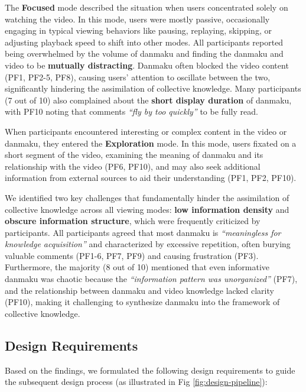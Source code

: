 The \textbf{Focused} mode described the situation when users concentrated solely on watching the video. In this mode, users were mostly passive, occasionally engaging in typical viewing behaviors like pausing, replaying, skipping, or adjusting playback speed to shift into other modes. All participants reported being overwhelmed by the volume of danmaku and finding the danmaku and video to be \textbf{mutually distracting}. Danmaku often blocked the video content (PF1, PF2-5, PF8), causing users’ attention to oscillate between the two, significantly hindering the assimilation of collective knowledge. Many participants (7 out of 10) also complained about the \textbf{short display duration} of danmaku, with PF10 noting that comments \textit{``fly by too quickly''} to be fully read.


When participants encountered interesting or complex content in the video or danmaku, they entered the \textbf{Exploration} mode. In this mode, users fixated on a short segment of the video, examining the meaning of danmaku and its relationship with the video (PF6, PF10), and may also seek additional information from external sources to aid their understanding (PF1, PF2, PF10).


We identified two key challenges that fundamentally hinder the assimilation of collective knowledge across all viewing modes: \textbf{low information density} and \textbf{obscure information structure}, which were frequently criticized by participants. All participants agreed that most danmaku is \textit{``meaningless for knowledge acquisition''} and characterized by excessive repetition, often burying valuable comments (PF1-6, PF7, PF9) and causing frustration (PF3). Furthermore, the majority (8 out of 10) mentioned that even informative danmaku was chaotic because the \textit{``information pattern was unorganized''} (PF7), and the relationship between danmaku and video knowledge lacked clarity (PF10), making it challenging to synthesize danmaku into the framework of collective knowledge. 



\subsection{Design Requirements}
\label{drs}

Based on the findings, we formulated the following design requirements to guide the subsequent design process (as illustrated in Fig \ref{fig:design-pipeline}): 

